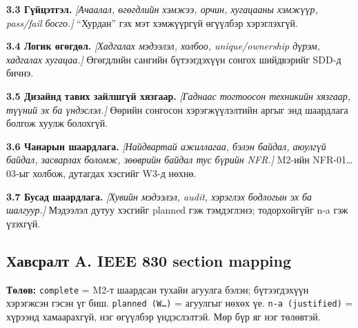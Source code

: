 \documentclass[
  11pt,
  a4paper,
]{article}
\begin{document}
\textbf{3.3 Гүйцэтгэл.} \emph{{[}Ачаалал, өгөгдлийн хэмжээ, орчин,
хугацааны хэмжүүр, pass/fail босго.{]}} ``Хурдан'' гэх мэт хэмжүүргүй
өгүүлбэр хэрэглэхгүй.

\textbf{3.4 Логик өгөгдөл.} \emph{{[}Хадгалах мэдээлэл, холбоо,
unique/ownership дүрэм, хадгалах хугацаа.{]}} Өгөгдлийн сангийн
бүтээгдэхүүн сонгох шийдвэрийг SDD-д бичнэ.

\textbf{3.5 Дизайнд тавих зайлшгүй хязгаар.} \emph{{[}Гаднаас тогтоосон
техникийн хязгаар, түүний эх ба үндэслэл.{]}} Өөрийн сонгосон
хэрэгжүүлэлтийн аргыг энд шаардлага болгож хуулж болохгүй.

\textbf{3.6 Чанарын шаардлага.} \emph{{[}Найдвартай ажиллагаа, бэлэн
байдал, аюулгүй байдал, засварлах боломж, зөөврийн байдал тус бүрийн
NFR.{]}} M2-ийн NFR-01\ldots03-ыг холбож, дутагдах хэсгийг W3-д нөхнө.

\textbf{3.7 Бусад шаардлага.} \emph{{[}Хувийн мэдээлэл, audit, хэрэглэх
бодлогын эх ба шалгуур.{]}} Мэдээлэл дутуу хэсгийг planned гэж
тэмдэглэнэ; тодорхойгүйг n-a гэж үзэхгүй.

\subsection{Хавсралт A. IEEE 830 section
mapping}\label{doc3-ux445ux430ux432ux441ux440ux430ux43bux442-a.-ieee-830-section-mapping}

\textbf{Төлөв:} \nolinkurl{complete} = M2-т шаардсан тухайн агуулга
бэлэн; бүтээгдэхүүн хэрэгжсэн гэсэн үг биш. \nolinkurl{planned (W…)} =
агуулгыг нөхөх үе. \nolinkurl{n-a (justified)} = хүрээнд хамаарахгүй,
нэг өгүүлбэр үндэслэлтэй. Мөр бүр яг нэг төлөвтэй.
\end{document}
